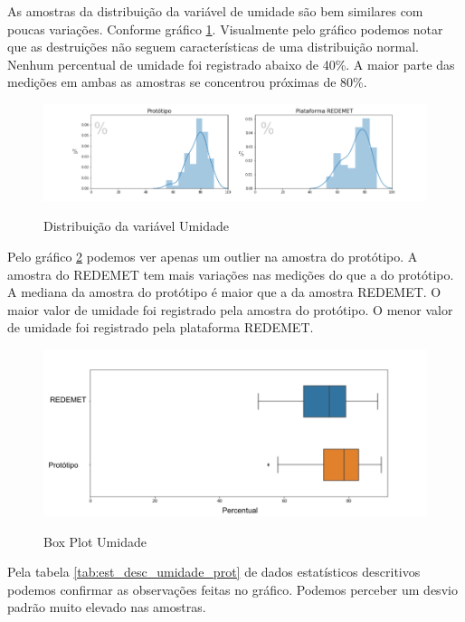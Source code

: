 As amostras da distribuição da variável de umidade são bem similares com poucas variações. Conforme gráfico \ref{fig:dist_umidade}. Visualmente pelo gráfico podemos notar que as destruições não seguem características de uma distribuição normal. Nenhum percentual de umidade foi registrado abaixo de 40\%. A maior parte das medições em ambas as amostras se concentrou próximas de 80\%.

\newpage

\begin{figure} [!h]
    \centering
    \caption{Distribuição da variável Umidade}
    \includegraphics [scale = 0.5] {Figuras/dist_umidade.png}
    \label{fig:dist_umidade}
\end{figure}

Pelo gráfico \ref{fig:box_plot_umidade} podemos ver apenas um outlier na amostra do protótipo. A amostra do REDEMET tem mais variações nas medições do que a do protótipo. A mediana da amostra do protótipo é maior que a da amostra REDEMET. O maior valor de umidade foi registrado pela amostra do protótipo. O menor valor de umidade foi registrado pela plataforma REDEMET.

\begin{figure} [!h]
    \centering
    \caption{Box Plot Umidade}
    \includegraphics [scale = 0.5] {Figuras/box_plot_umidade.png}
    \label{fig:box_plot_umidade}
\end{figure}

Pela tabela \ref{tab:est_desc_umidade_prot} de dados estatísticos descritivos  podemos confirmar as observações feitas no gráfico. Podemos perceber um desvio padrão muito elevado nas amostras.

